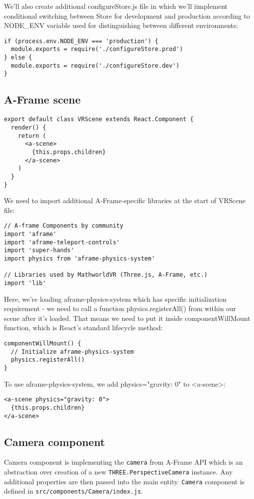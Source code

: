 We'll also create additional configureStore.js file in which we'll iimplement conditional switching between Store for development and production according to NODE_ENV variable used for distinguishing between different environments:


\begin{lstlisting}
if (process.env.NODE_ENV === 'production') {
  module.exports = require('./configureStore.prod')
} else {
  module.exports = require('./configureStore.dev')
}
\end{lstlisting}

\subsection{A-Frame scene}


\begin{lstlisting}
export default class VRScene extends React.Component {
  render() {
    return (
      <a-scene>
        {this.props.children}
      </a-scene>
    )
  }
}
\end{lstlisting}

We need to import additional A-Frame-specific libraries at the start of VRScene file:


\begin{lstlisting}
// A-frame Components by community
import 'aframe'
import 'aframe-teleport-controls'
import 'super-hands'
import physics from 'aframe-physics-system'

// Libraries used by MathworldVR (Three.js, A-Frame, etc.)
import 'lib'
\end{lstlisting}

Here, we're loading aframe-physics-system which has specific initialization requirement - we need to call a function physics.registerAll() from within our scene after it's loaded. That means we need to put it inside componentWillMount function, which is React's standard lifecycle method:


\begin{lstlisting}
componentWillMount() {
  // Initialize aframe-physics-system
  physics.registerAll()
}
\end{lstlisting}

To use aframe-physics-system, we add physics="gravity: 0" to <a-scene>:


\begin{lstlisting}
<a-scene physics="gravity: 0">
  {this.props.children}
</a-scene>
\end{lstlisting}

\subsection{Camera component}
Camera component is implementing the \texttt{camera} from A-Frame API which is an abstraction over creation of a new \texttt{THREE.PerspectiveCamera} instance. Any additional properties are then passed into the main entity. \texttt{Camera} component is defined in \texttt{src/components/Camera/index.js}.

